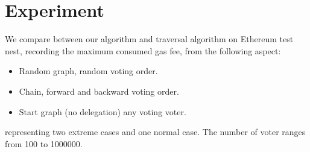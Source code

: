 \section{Experiment}
We compare between our algorithm and traversal algorithm on Ethereum test nest, recording the maximum consumed gas fee, from the following aspect:

\begin{itemize}
	\item Random graph, random voting order.
	\item Chain, forward and backward voting order.
	\item Start graph (no delegation) any voting voter. 
\end{itemize}
representing two extreme cases and one normal case. The number of voter ranges from 100 to 1000000.